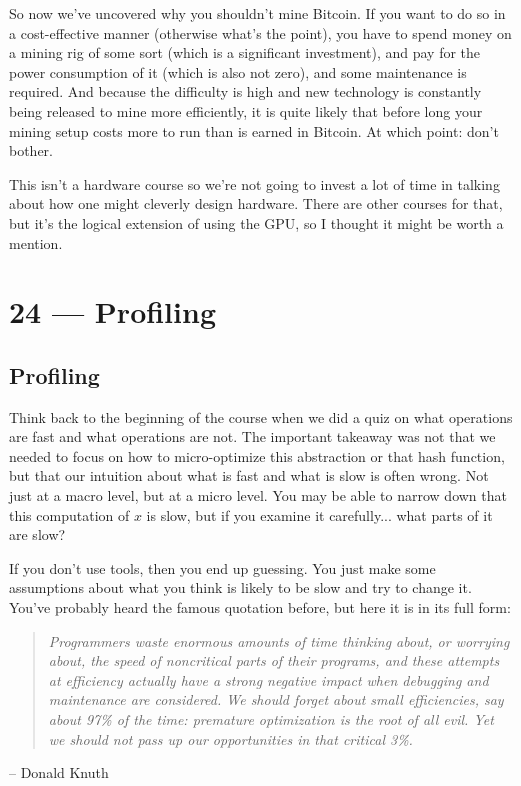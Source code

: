 \documentclass[a4paper]{report}
\begin{document}
So now we've uncovered why you shouldn't mine Bitcoin. If you want to do so in a cost-effective manner (otherwise what's the point), you have to spend money on a mining rig of some sort (which is a significant investment), and pay for the power consumption of it (which is also not zero), and some maintenance is required. And because the difficulty is high and new technology is constantly being released to mine more efficiently, it is quite likely that before long your mining setup costs more to run than is earned in Bitcoin. At which point: don't bother.

This isn't a hardware course so we're not going to invest a lot of time in talking about how one might cleverly design hardware. There are other courses for that, but it's the logical extension of using the GPU, so I thought it might be worth a mention.










\chapter*{24 --- Profiling}


\section*{Profiling}

Think back to the beginning of the course when we did a quiz on what operations are fast and what operations are not. The important takeaway was not that we needed to focus on how to micro-optimize this abstraction or that hash function, but that our intuition about what is fast and what is slow is often wrong. Not just at a macro level, but at a micro level. You may be able to narrow down that this computation of $x$ is slow, but if you examine it carefully... what parts of it are slow?

If you don't use tools, then you end up guessing. You just make some assumptions about what you think is likely to be slow and try to change it. You've probably heard the famous quotation before, but here it is in its full form:

\begin{quote}
\textit{Programmers waste enormous amounts of time thinking about, or worrying about, the speed of noncritical parts of their programs, and these attempts at efficiency actually have a strong negative impact when debugging and maintenance are considered. We should forget about small efficiencies, say about 97\% of the time: premature optimization is the root of all evil. Yet we should not pass up our opportunities in that critical 3\%.}
\end{quote}
	\hfill -- Donald Knuth
\end{document}

